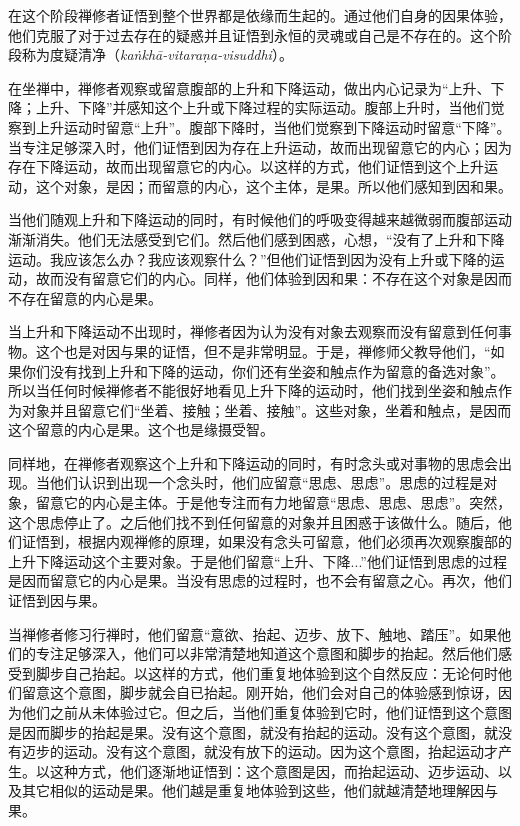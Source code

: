 在这个阶段禅修者证悟到整个世界都是依缘而生起的。通过他们自身的因果体验，他们克服了对于过去存在的疑惑并且证悟到永恒的灵魂或自己是不存在的。这个阶段称为度疑清净（{\it ka\.nkh\=a-vitara\d na-visuddhi}）。

在坐禅中，禅修者观察或留意腹部的上升和下降运动，做出内心记录为“上升、下降；上升、下降”并感知这个上升或下降过程的实际运动。腹部上升时，当他们觉察到上升运动时留意“上升”。腹部下降时，当他们觉察到下降运动时留意“下降”。当专注足够深入时，他们证悟到因为存在上升运动，故而出现留意它的内心；因为存在下降运动，故而出现留意它的内心。以这样的方式，他们证悟到这个上升运动，这个对象，是因；而留意的内心，这个主体，是果。所以他们感知到因\1和果。

当他们随观上升和下降运动的同时，有时候他们的呼吸变得越来越微弱而腹部运动渐渐消失。他们无法感受到它们。然后他们感到困惑，心想，“没有了上升和下降运动。我应该怎么办？我应该观察什么？”但他们证悟到因为没有上升或下降的运动，故而没有留意它们的内心。同样，他们体验到因和果：不存在这个对象是因而不存在留意的内心是果。

当上升和下降运动不出现时，禅修者因为认为没有对象去观察而没有留意到任何事物。这个也是对因与果的证悟，但不是非常明显。于是，禅修师父教导他们，“如果你们没有找到上升和下降的运动，你们还有坐姿和触点作为留意的备选对象”。所以当任何时候禅修者不能很好地看见上升下降的运动时，他们找到坐姿和触点作为对象并且留意它们“坐着、接触；坐着、接触”。这些对象，坐着和触点，是因而这个留意的内心是果。这个也是缘摄受智。

同样地，在禅修者观察这个上升和下降运动的同时，有时念头或对事物的思虑会出现。当他们认识到出现一个念头时，他们应留意“思虑、思虑”。思虑的过程是对象，留意它的内心是主体。于是他专注而有力地留意“思虑、思虑、思虑”。突然，这个思虑停止了。之后他们找不到任何留意的对象并且困惑于该做什么。随后，他们证悟到，\1根据内观禅修的原理，如果没有念头可留意，他们必须再次观察腹部的上升下降运动这个主要对象。于是他们留意“上升、下降...”他们证悟到思虑的过程是因而留意它的内心是果。当没有思虑的过程时，也不会有留意之心。再次，他们证悟到因与果。

当禅修者修习行禅时，他们留意“意欲、抬起、迈步、放下、触地、踏压”。如果他们的专注足够深入，他们可以非常清楚地知道这个意图和脚步的抬起。然后他们感受到脚步自己抬起。以这样的方式，他们重复地体验到这个自然反应：无论何时他们留意这个意图，脚步就会自已抬起。刚开始，他们会对自己的体验感到惊讶，因为他们之前从未体验过它。但之后，当他们重复体验到它时，他们证悟到这个意图是因而脚步的抬起是果。没有这个意图，就没有抬起的运动。没有这个意图，就没有迈步的运动。没有这个意图，就没有放下的运动。因为这个意图，抬起运动才产生。以这种方式，他们逐渐地证悟到：这个意图是因，而抬起运动、迈步运动、以及其它相似的运动是果。他们越是重复地体验到这些，他们就越清楚地理解因与果。

